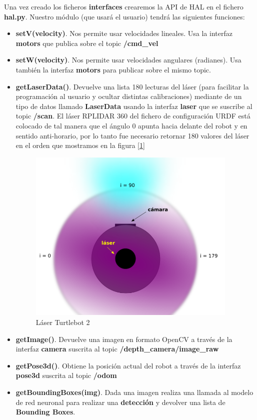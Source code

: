 Una vez creado los ficheros \textbf{interfaces} crearemos la API de HAL en el fichero \textbf{hal.py}. Nuestro módulo (que usará el usuario) tendrá las siguientes funciones:\\
\begin{itemize}
	\item \textbf{setV(velocity)}. Nos permite usar velocidades lineales. Usa la interfaz \textbf{motors} que publica sobre el topic \textbf{/cmd\_vel}
	\item \textbf{setW(velocity)}. Nos permite usar velocidades angulares (radianes). Usa también la interfaz \textbf{motors} para publicar sobre el mismo topic.
	\item \textbf{getLaserData()}. Devuelve una lista 180 lecturas del láser (para facilitar la programación al usuario y ocultar distintas calibraciones) mediante de un tipo de datos llamado \textbf{LaserData} usando la interfaz \textbf{laser} que se suscribe al topic \textbf{/scan}. El láser RPLIDAR 360 del fichero de configuración URDF está colocado de tal manera que el ángulo 0 apunta hacia delante del robot y en sentido anti-horario, por lo tanto fue necesario retornar 180 valores del láser en el orden que mostramos en la figura [\ref{fig:vista_planta_turtlebot2}]
\begin{figure} [H]
  \begin{center}
    \includegraphics[width=10cm]{imagenes/vista-planta-turtlebot2.png}
  \end{center}
  \caption[Láser Turtlebot 2]{Láser Turtlebot 2}
  \label{fig:vista_planta_turtlebot2}
\end{figure}
	\item \textbf{getImage()}. Devuelve una imagen en formato OpenCV a través de la interfaz \textbf{camera} suscrita al topic \textbf{/depth\_camera/image\_raw}
	\item \textbf{getPose3d()}. Obtiene la posición actual del robot a través de la interfaz \textbf{pose3d} suscrita al topic \textbf{/odom}
	\item \textbf{getBoundingBoxes(img)}. Dada una imagen realiza una llamada al modelo de red neuronal para realizar una \textbf{detección} y devolver una lista de \textbf{Bounding Boxes}.  
\end{itemize}\

